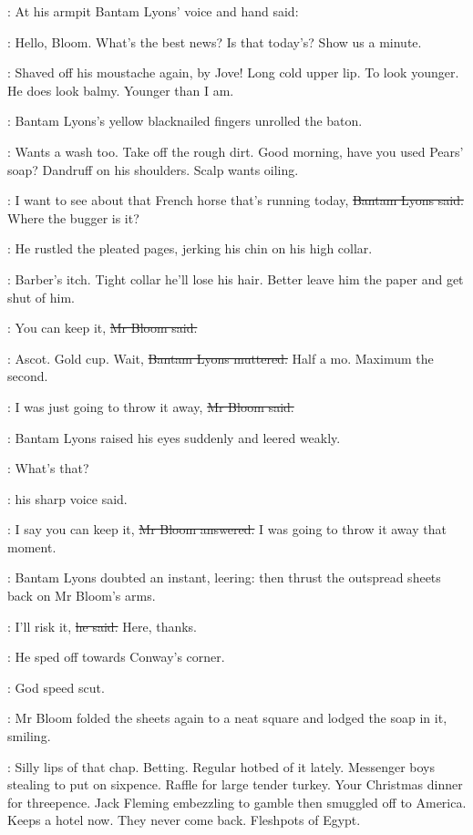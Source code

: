 :
At his armpit
Bantam Lyons' voice and hand said:

\lyons:
Hello, Bloom.
What's the best news?
Is that today's?
Show us a minute.

\BloomInt:
Shaved off his moustache again, by Jove!
Long cold upper lip.
To look younger.
He does look balmy.
Younger than I am.

:
Bantam Lyons's yellow blacknailed fingers unrolled the baton.

\BloomInt:
Wants a wash too.
Take off the rough dirt.
Good morning, have you used Pears' soap?
Dandruff on his shoulders.
Scalp wants oiling.

\lyons:
I want to see about that French horse that's running today,
\sout{Bantam Lyons said.}
Where the bugger is it?

:
He rustled the pleated pages,
jerking his chin on his high collar.

\BloomInt:
Barber's itch.
Tight collar he'll lose his hair.
Better leave him the paper and get shut of him.

\Bloom:
You can keep it,
\sout{Mr Bloom said.}

\lyons:
Ascot.
Gold cup.
Wait,
\sout{Bantam Lyons muttered.}
Half a mo.
Maximum the second.

\Bloom:
I was just going to throw it away,
\sout{Mr Bloom said.}

:
Bantam Lyons raised his eyes suddenly and leered weakly.

\lyons:
What's that?

:
his sharp voice said.

\Bloom:
I say you can keep it,
\sout{Mr Bloom answered.}
I was going to throw it away that moment.

:
Bantam Lyons doubted an instant, leering:
then thrust the outspread sheets back on Mr Bloom's arms.

\lyons:
I'll risk it,
\sout{he said.}
Here, thanks.

:
He sped off towards Conway's corner.

\BloomInt:
God speed scut.

:
Mr Bloom folded the sheets again to a neat square
and lodged the soap in it,
smiling.

\BloomInt:
Silly lips of that chap.
Betting.
Regular hotbed of it lately.
Messenger boys stealing to put on sixpence.
Raffle for large tender turkey.
Your Christmas dinner for threepence.
Jack Fleming embezzling to gamble
then smuggled off to America.
Keeps a hotel now.
They never come back.
Fleshpots of Egypt.

